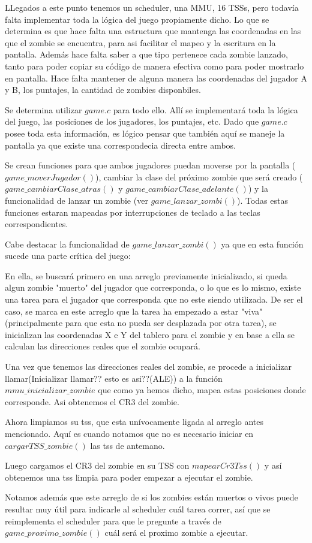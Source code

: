 \documentclass[a4paper]{article}
\begin{document}
LLegados a este punto tenemos un scheduler, una MMU, 16 TSSs, pero todavía falta implementar toda la lógica del juego propiamente dicho. Lo que se determina es que hace falta una estructura que mantenga las coordenadas en las que el zombie se encuentra, para asi facilitar el mapeo y la escritura en la pantalla. Además hace falta saber a que tipo pertenece cada zombie lanzado, tanto para poder copiar su código de manera efectiva como para poder mostrarlo en pantalla. Hace falta mantener de alguna manera las coordenadas del jugador A y B, los puntajes, la cantidad de zombies disponbiles.

Se determina utilizar $game.c$ para todo ello. Allí se implementará toda la lógica del juego, las posiciones de los jugadores, los puntajes, etc. Dado que $game.c$ posee toda esta información, es lógico pensar que también aquí se maneje la pantalla ya que existe una correspondecia directa entre ambos.

Se crean funciones para que ambos jugadores puedan moverse por la pantalla ($game\_ moverJugador()$), cambiar la clase del próximo zombie que será creado ($game\_ cambiarClase\_ atras()$ y $game\_ cambiarClase\_ adelante()$) y la funcionalidad de lanzar un zombie (ver $game\_ lanzar\_ zombi()$). Todas estas funciones estaran mapeadas por interrupciones de teclado a las teclas correspondientes.

Cabe destacar la funcionalidad de $game\_ lanzar\_ zombi()$ ya que en esta función sucede una parte crítica del juego:

En ella, se buscará primero en una arreglo previamente inicializado, si queda algun zombie "muerto" del jugador que corresponda, o lo que es lo mismo, existe una tarea para el jugador que corresponda que no este siendo utilizada. De ser el caso, se marca en este arreglo que la tarea ha empezado a estar "viva" (principalmente para que esta no pueda ser desplazada por otra tarea), se inicializan las coordenadas X e Y del tablero para el zombie y en base a ella se calculan las direcciones reales que el zombie ocupará.

Una vez que tenemos las direcciones reales del zombie, se procede a inicializar llamar(Inicializar llamar?? esto es asi??(ALE)) a la función $mmu\_ inicializar\_ zombie$ que como ya hemos dicho, mapea estas posiciones donde corresponde. Asi obtenemos el CR3 del zombie.

Ahora limpiamos su tss, que esta unívocamente ligada al arreglo antes mencionado. Aquí es cuando notamos que no es necesario iniciar en $cargarTSS\_ zombie()$ las tss de antemano.

Luego cargamos el CR3 del zombie en su TSS con $mapearCr3Tss()$ y así obtenemos una tss limpia para poder empezar a ejecutar el zombie.

Notamos además que este arreglo de si los zombies están muertos o vivos puede resultar muy útil para indicarle al scheduler cuál tarea correr, así que se reimplementa el scheduler para que le pregunte a través de $game\_ proximo\_ zombie()$ cuál será el proximo zombie a ejecutar.
\end{document}
